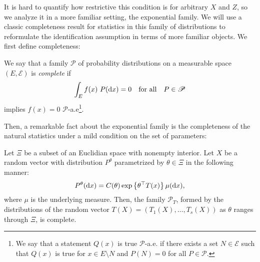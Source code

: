 It is hard to quantify how restrictive this condition is for arbitrary $ X $ and $ Z $, so we analyze it in a more familiar setting, the exponential family.
We will use a classic completeness result for statistics in this family of distributions to reformulate the identification assumption in terms of more familiar objects.
We first define completeness:
\begin{deff}
    \cite{lehmann59} We say that a family $ \mathscr{P} $ of probability distributions on a measurable space $ ( E, \mathcal{E} ) $ is \emph{complete} if
    \begin{equation*}
        \int_{ E } f ( x ) \ P ( \mathrm{d} x ) = 0 \quad \text{for all} \quad P \in \mathscr{P}
    \end{equation*}
    implies $ f ( x ) = 0 $ $ \mathscr{P} $-a.e\footnote{We say that a statement $ Q ( x ) $ is true $ \mathscr{P} $-a.e. if there exists a set $ N \in \mathcal{E} $ such that $ Q ( x ) $ is true for $ x \in E \setminus N $ and $ P ( N ) = 0 $ for all $ P \in \mathscr{P} $.}.
\end{deff}
Then, a remarkable fact about the exponential family is the completeness of the natural statistics under a mild condition on the set of parameters:
\begin{thm}
    \label{thm: completeness of exp family}
    \cite{lehmann59} Let $ \Xi $ be a subset of an Euclidian space with nonempty interior.
    Let $ X $ be a random vector with distribution $ P^{ \theta } $ parametrized by $ \theta \in \Xi $ in the following manner:
    \begin{equation*}
        P^{ \theta } ( \mathrm{d} x ) = C ( \theta ) \exp \left\{ \theta^{ \top } T ( x ) \right\} \mu ( \mathrm{d} x )
    ,\end{equation*}
    where $ \mu $ is the underlying measure.
    Then, the family $ \mathscr{P}_{ T } $, formed by the distributions of the random vector $ T ( X ) = ( T_{ 1 } ( X ), \dots, T_{ s } ( X ) ) $ as $ \theta $ ranges through $ \Xi $, is complete.
\end{thm}

